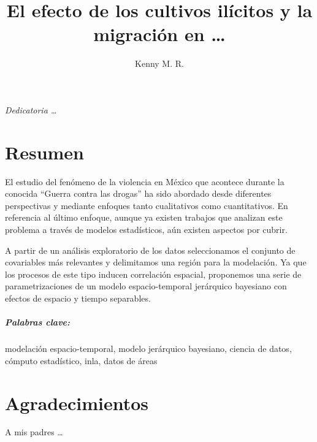 \documentclass[letterpaper,12pt,twoside]{book}  %
\author{Kenny M. R.}
\title{El efecto de los cultivos ilícitos y la migración en \ldots}
\begin{document}
\maketitle  %

\thispagestyle{empty}  %

\frontmatter

\chapter*{}
\begin{flushright}%
  \emph{Dedicatoria \ldots}
  \thispagestyle{empty}
\end{flushright}

\chapter*{Resumen}

El estudio del fenómeno de la violencia en México que acontece durante la conocida ``Guerra contra las drogas'' ha sido abordado desde diferentes perspectivas y mediante enfoques tanto cualitativos como cuantitativos. En referencia al último enfoque, aunque ya existen trabajos que analizan este problema a través de modelos estadísticos, aún existen aspectos por cubrir.

A partir de un análisis exploratorio de los datos seleccionamos el conjunto de covariables más relevantes y delimitamos una región para la modelación. Ya que los procesos de este tipo inducen correlación espacial, proponemos una serie de parametrizaciones de un modelo espacio-temporal jerárquico bayesiano con efectos de espacio y tiempo separables. 
\\
\paragraph{Palabras clave:} modelación espacio-temporal, modelo jerárquico bayesiano, ciencia de datos, cómputo estadístico, inla, datos de áreas

\chapter*{Agradecimientos}

A mis padres \ldots

\tableofcontents
\end{document}
